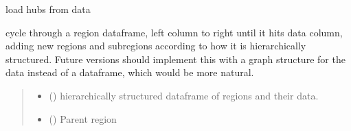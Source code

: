 \documentclass[letterpaper,10pt,english]{sphinxmanual}
\begin{document}
\begin{fulllineitems}
\begin{fulllineitems}
\end{fulllineitems}


\begin{fulllineitems}
\label{\detokenize{src.models.hydrogen.network.grid:src.models.hydrogen.network.grid.Grid.load_hubs}}
\pysigstartsignatures
\pysiglinewithargsret
{}
{}
{}
\pysigstopsignatures
\sphinxAtStartPar
load hubs from data

\end{fulllineitems}


\begin{fulllineitems}
\label{\detokenize{src.models.hydrogen.network.grid:src.models.hydrogen.network.grid.Grid.recursive_region_generation}}
\pysigstartsignatures
\pysiglinewithargsret
{}
{\sphinxparamcomma {}}
{}
\pysigstopsignatures
\sphinxAtStartPar
cycle through a region dataframe, left column to right until it hits data column, adding
new regions and subregions according to how it is hierarchically structured. Future versions
should implement this with a graph structure for the data instead of a dataframe, which
would be more natural.
\begin{quote}\begin{description}
\begin{itemize}
\item {} 
\sphinxAtStartPar
{} () \textendash{} hierarchically structured dataframe of regions and their data.

\item {} 
\sphinxAtStartPar
{} ({\hyperref[\detokenize{src.models.hydrogen.network.region:src.models.hydrogen.network.region.Region}]{}}) \textendash{} Parent region

\end{itemize}


\end{description}
\end{quote}
\end{fulllineitems}
\end{fulllineitems}
\end{document}
